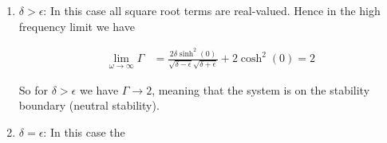\documentclass[12pt, a4paper]{article}
\begin{document}
\begin{enumerate}
\begin{enumerate}
        \begin{enumerate}
            \item $\delta > \epsilon$: In this case all square root terms are real-valued. Hence in the high frequency limit we have 
            
            \begin{align*}
                \lim_{\omega \rightarrow \infty} \Gamma &= \frac{2 \delta  \sinh^2 (0)}{\sqrt{\delta -\epsilon } \sqrt{\delta +\epsilon }}+2 \cosh ^2 (0) =2
            \end{align*}

            So for $\delta > \epsilon$ we have $\Gamma \rightarrow 2$, meaning that the system is on the stability boundary (neutral stability).

            \item $\delta = \epsilon$: In this case the 


        \end{enumerate}

        
    \end{enumerate}
\end{enumerate}
\end{document}
